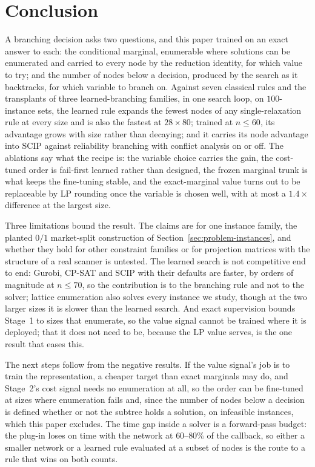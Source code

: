 \documentclass[final,5p,times,twocolumn,authoryear]{elsarticle}
\begin{document}
\section{Conclusion}
\label{sec:conclusion}

A branching decision asks two questions, and this paper trained on an exact answer to each: the conditional marginal, enumerable where solutions can be enumerated and carried to every node by the reduction identity, for which value to try; and the number of nodes below a decision, produced by the search as it backtracks, for which variable to branch on. Against seven classical rules and the transplants of three learned-branching families, in one search loop, on $100$-instance sets, the learned rule expands the fewest nodes of any single-relaxation rule at every size and is also the fastest at $28\times80$; trained at $n\le60$, its advantage grows with size rather than decaying; and it carries its node advantage into SCIP against reliability branching with conflict analysis on or off. The ablations say what the recipe is: the variable choice carries the gain, the cost-tuned order is fail-first learned rather than designed, the frozen marginal trunk is what keeps the fine-tuning stable, and the exact-marginal value turns out to be replaceable by LP rounding once the variable is chosen well, with at most a $1.4\times$ difference at the largest size.

Three limitations bound the result. The claims are for one instance family, the planted $0/1$ market-split construction of Section~\ref{sec:problem-instances}, and whether they hold for other constraint families or for projection matrices with the structure of a real scanner is untested. The learned search is not competitive end to end: Gurobi, CP-SAT and SCIP with their defaults are faster, by orders of magnitude at $n\le70$, so the contribution is to the branching rule and not to the solver; lattice enumeration also solves every instance we study, though at the two larger sizes it is slower than the learned search. And exact supervision bounds Stage~1 to sizes that enumerate, so the value signal cannot be trained where it is deployed; that it does not need to be, because the LP value serves, is the one result that eases this.

The next steps follow from the negative results. If the value signal's job is to train the representation, a cheaper target than exact marginals may do, and Stage~2's cost signal needs no enumeration at all, so the order can be fine-tuned at sizes where enumeration fails and, since the number of nodes below a decision is defined whether or not the subtree holds a solution, on infeasible instances, which this paper excludes. The time gap inside a solver is a forward-pass budget: the plug-in loses on time with the network at $60$--$80\%$ of the callback, so either a smaller network or a learned rule evaluated at a subset of nodes is the route to a rule that wins on both counts.
\end{document}
